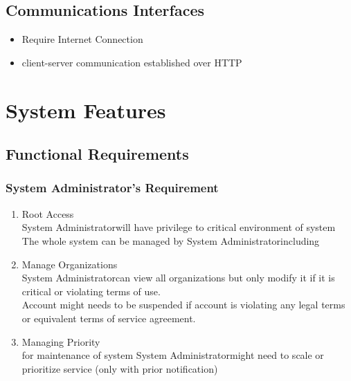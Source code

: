 \documentclass{report}
\def\superuser{System Administrator}
\begin{document}
\section{Communications Interfaces}
\begin{itemize}
	\item Require Internet Connection
	\item client-server communication established over HTTP
\end{itemize}

\chapter{System Features}
\section{Functional Requirements}
\label{functions}

\subsection{\superuser's Requirement}
\begin{enumerate}[start=1,label={\bfseries REQ \arabic*:}]
	\addtolength{\itemindent}{40pt}
	\item Root Access
		\\ \superuser \space will have privilege to critical environment of system
		\\ The whole system can be managed by \superuser \space including 
	\item Manage Organizations
		\\ \superuser \space can view all organizations but only modify it if it is critical or violating terms of use.
		\\ Account might needs to be suspended if account is violating any legal terms or equivalent terms of service agreement.
	\item Managing Priority
		\\ for maintenance of system \superuser \space might need to scale or prioritize service (only with prior notification)
		
	
\end{enumerate}
\end{document}
